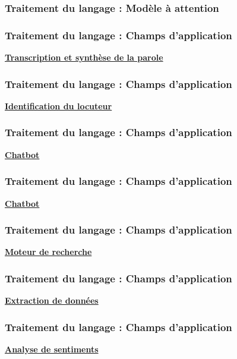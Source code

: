 \documentclass{formation}
\begin{document}
\begin{frame}
  \frametitle{Traitement du langage : Modèle à attention} 
  \begin{center}
    \href{https://demo.allennlp.org/machine-comprehension}{}
  \end{center}
\end{frame}

\begin{frame}
  \frametitle{Traitement du langage : Champs d'application}
  \underline{\textbf{Transcription et synthèse de la parole}}
\end{frame}

\begin{frame}
  \frametitle{Traitement du langage : Champs d'application}
  \underline{\textbf{Identification du locuteur}}
\end{frame}

\begin{frame}
  \frametitle{Traitement du langage : Champs d'application}
  \underline{\textbf{Chatbot}}
\end{frame}

\begin{frame}
  \frametitle{Traitement du langage : Champs d'application}
  \underline{\textbf{Chatbot}}
\end{frame}

\begin{frame}
  \frametitle{Traitement du langage : Champs d'application}
  \underline{\textbf{Moteur de recherche}}
\end{frame}

\begin{frame}
  \frametitle{Traitement du langage : Champs d'application}
  \underline{\textbf{Extraction de données}}
  \begin{center}
    \href{https://demo.allennlp.org/named-entity-recognition}{}
  \end{center}
\end{frame}

\begin{frame}
  \frametitle{Traitement du langage : Champs d'application}
  \underline{\textbf{Analyse de sentiments}}
  \begin{center}
    \href{https://text-processing.com/demo/sentiment/}{}
  \end{center}
\end{frame}
\end{document}
